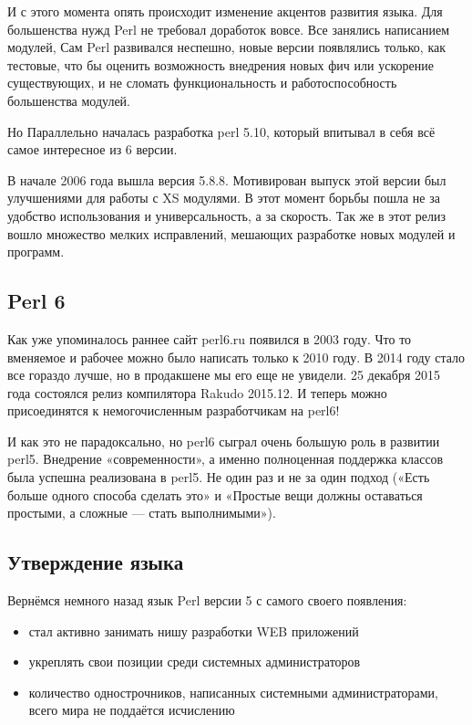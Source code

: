 И с этого момента опять происходит изменение акцентов развития языка. Для большенства нужд Perl не требовал доработок вовсе. Все занялись написанием модулей, Сам Perl развивался неспешно, новые версии появлялись только, как тестовые, что бы оценить возможность внедрения новых фич или ускорение существующих, и не сломать функциональность и работоспособность большенства модулей.

Но Параллельно началась разработка perl 5.10, который впитывал в себя всё самое интересное из 6 версии.

В начале 2006 года вышла версия 5.8.8. Мотивирован выпуск этой версии был улучшениями для работы с XS модулями. В этот момент борьбы пошла не за удобство использования и универсальность, а за скорость. Так же в этот релиз вошло множество мелких исправлений, мешающих разработке новых модулей и программ.

\subsection{Perl 6}

Как уже упоминалось раннее сайт perl6.ru появился в 2003 году. Что то вменяемое и рабочее можно было написать только к 2010 году. В 2014 году стало все гораздо лучше, но в продакшене мы его еще не увидели. 25 декабря 2015 года состоялся релиз компилятора Rakudo 2015.12. И теперь можно присоединятся к немогочисленным разработчикам на perl6!

И как это не парадоксально, но perl6 сыграл очень большую роль в развитии perl5. Внедрение «современности», а именно полноценная поддержка классов была успешна реализована в perl5. Не один раз и не за один подход («Есть больше одного способа сделать это» и «Простые вещи должны оставаться простыми, а сложные — стать выполнимыми»).

\subsection{Утверждение языка}
Вернёмся немного назад язык Perl версии 5 с самого своего появления:
\begin{itemize}
 \item стал активно занимать нишу разработки WEB приложений
 \item укреплять свои позиции среди системных администраторов
 \item количество однострочников, написанных системными администраторами, всего мира не поддаётся исчислению
\end{itemize}

